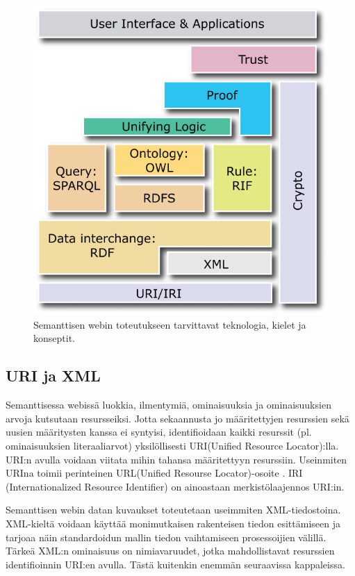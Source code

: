 \documentclass[finnish]{tktltiki2}
\theoremstyle{definition}
\theoremstyle{remark}
\begin{document}
\begin{figure}[h]
 \centering
 \includegraphics[scale=0.50]{stack.png}
 \caption{Semanttisen webin toteutukseen tarvittavat teknologia, kielet ja konseptit. }
 \label{stack}
\end{figure}
 
\subsection{URI ja XML}

Semanttisessa webissä luokkia, ilmentymiä, ominaisuuksia ja ominaisuuksien
arvoja kutsutaan resursseiksi. Jotta sekaannusta jo määritettyjen resurssien
sekä uusien määritysten kanssa ei syntyisi, identifioidaan kaikki resurssit (pl.
ominaisuuksien literaaliarvot) yksilöllisesti URI(Unified Resource Locator):lla.
URI:n avulla voidaan viitata mihin tahansa määritettyyn resurssiin. Useinmiten
URIna toimii perinteinen URL(Unified Resourse Locator)-osoite \cite{BHL01}. IRI
(Internationalized Resource Identifier) on ainoastaan merkistölaajennos URI:in.
 
Semanttisen webin datan kuvaukset toteutetaan useimmiten XML-tiedostoina.
XML-kieltä voidaan käyttää monimutkaisen rakenteisen tiedon esittämiseen ja
tarjoaa näin standardoidun mallin tiedon vaihtamiseen prosessoijien välillä.
Tärkeä XML:n ominaisuus on nimiavaruudet, jotka mahdollistavat resurssien
identifioinnin URI:en avulla. Tästä kuitenkin enemmän seuraavissa kappaleissa. 
\end{document}
